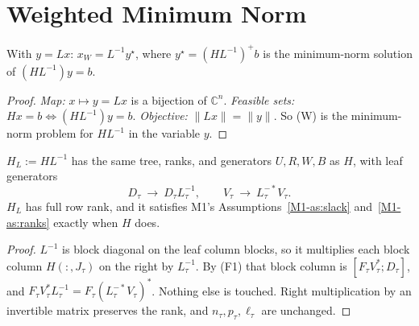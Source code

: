 \section{Weighted Minimum Norm}\label{sec:weighted}

\begin{lemma}\label{lem:Wsub}
With $y=Lx$: $x_W=L^{-1}y^\star$, where $y^\star=(HL^{-1})^+b$ is the minimum-norm solution of
$(HL^{-1})y=b$.
\end{lemma}
\begin{proof}
\emph{Map:} $x\mapsto y=Lx$ is a bijection of $\mathbb{C}^n$. \emph{Feasible sets:}
$Hx=b\iff (HL^{-1})y=b$. \emph{Objective:} $\|Lx\|=\|y\|$. So (W) is the minimum-norm problem for
$HL^{-1}$ in the variable $y$.
\end{proof}

\begin{lemma}\label{lem:Wstruct}
$H_L:=HL^{-1}$ has the same tree, ranks, and generators $U,R,W,B$ as $H$, with leaf generators
\[
D_\tau\ \to\ D_\tau L_\tau^{-1},\qquad V_\tau\ \to\ L_\tau^{-*}V_\tau .
\]
$H_L$ has full row rank, and it satisfies M1's Assumptions~\ref{M1-as:slack} and~\ref{M1-as:ranks} exactly when $H$ does.
\end{lemma}
\begin{proof}
$L^{-1}$ is block diagonal on the leaf column blocks, so it multiplies each block column
$H(:,J_\tau)$ on the right by $L_\tau^{-1}$. By (F1) that block column is $[F_\tau V_\tau^*;D_\tau]$, and
$F_\tau V_\tau^*L_\tau^{-1}=F_\tau(L_\tau^{-*}V_\tau)^*$. Nothing else is touched. Right multiplication by an
invertible matrix preserves the rank, and $n_\tau,p_\tau,\ell_\tau$ are unchanged.
\end{proof}

